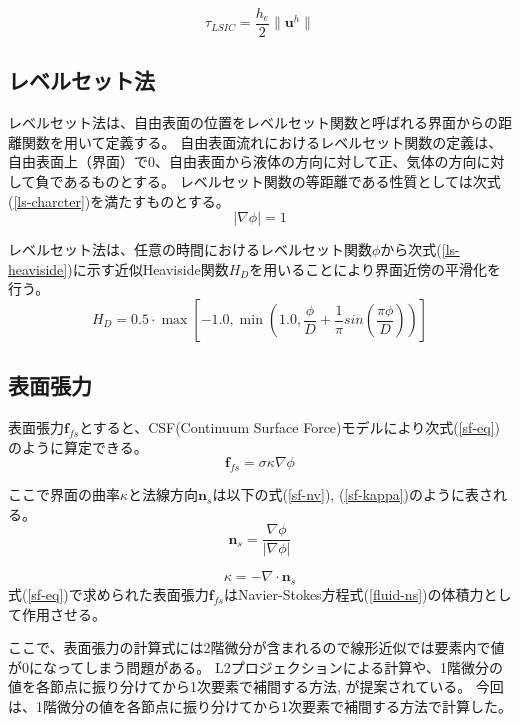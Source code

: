 \documentclass[8pt,a4paper]{article}
\newcommand{\bm}{\boldsymbol}
\begin{document}
\begin{equation}
\label{ls-tau_LSIC}
	\tau_{LSIC} = \frac{h_{e}}{2} \| \bm{u}^{h} \|
\end{equation}

\subsection{レベルセット法}
レベルセット法は、自由表面の位置をレベルセット関数と呼ばれる界面からの距離関数を用いて定義する。
自由表面流れにおけるレベルセット関数の定義は、自由表面上（界面）で0、自由表面から液体の方向に対して正、気体の方向に対して負であるものとする。
レベルセット関数の等距離である性質としては次式(\ref{ls-charcter})を満たすものとする。
\begin{equation}
\label{ls-charcter}
	| \nabla \phi | = 1
\end{equation}

レベルセット法は、任意の時間におけるレベルセット関数$\phi$から次式(\ref{ls-heaviside})に示す近似Heaviside関数$H_{D}$を用いることにより界面近傍の平滑化を行う。
\begin{equation}
\label{ls-heaviside}
	H_{D} = 0.5 \cdot \max \left[-1.0, \min \left(1.0, \frac{\phi}{D} + \frac{1}{\pi} sin\left(\frac{\pi \phi}{D}\right)\right) \right]
\end{equation}

\subsection{表面張力}
表面張力$\bm{f}_{fs}$とすると、CSF(Continuum Surface Force)モデルにより次式(\ref{sf-eq})のように算定できる。
\begin{equation}
\label{sf-eq}
	\bm{f}_{fs} = \sigma \kappa \nabla \phi
\end{equation}

ここで界面の曲率$\kappa$と法線方向$\bm{n}_{s}$は以下の式(\ref{sf-nv}), (\ref{sf-kappa})のように表される。
\begin{equation}
\label{sf-nv}
	\bm{n}_{s} = \frac{\nabla \phi}{| \nabla \phi |}
\end{equation}

\begin{equation}
\label{sf-kappa}
	\kappa = - \nabla \cdot \bm{n}_{s}
\end{equation}
式(\ref{sf-eq})で求められた表面張力$\bm{f}_{fs}$はNavier-Stokes方程式(\ref{fluid-ns})の体積力として作用させる。

ここで、表面張力の計算式には2階微分が含まれるので線形近似では要素内で値が0になってしまう問題がある。
L2プロジェクションによる計算\cite{Nagrath2003}や、1階微分の値を各節点に振り分けてから1次要素で補間する方法\cite{Matsumoto2006}, \cite{Shi2019}が提案されている。
今回は、1階微分の値を各節点に振り分けてから1次要素で補間する方法で計算した。
\end{document}
